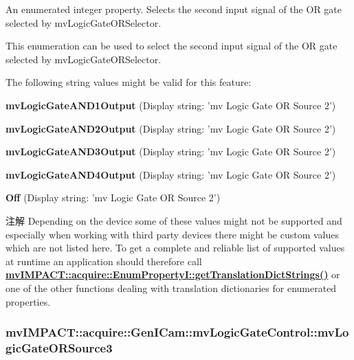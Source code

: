 An enumerated integer property. Selects the second input signal of the O\+R gate selected by mv\+Logic\+Gate\+O\+R\+Selector. 

This enumeration can be used to select the second input signal of the O\+R gate selected by mv\+Logic\+Gate\+O\+R\+Selector.

The following string values might be valid for this feature\+:
\begin{DoxyItemize}
\item {\bfseries mv\+Logic\+Gate\+A\+N\+D1\+Output} (Display string\+: 'mv Logic Gate O\+R Source 2')
\item {\bfseries mv\+Logic\+Gate\+A\+N\+D2\+Output} (Display string\+: 'mv Logic Gate O\+R Source 2')
\item {\bfseries mv\+Logic\+Gate\+A\+N\+D3\+Output} (Display string\+: 'mv Logic Gate O\+R Source 2')
\item {\bfseries mv\+Logic\+Gate\+A\+N\+D4\+Output} (Display string\+: 'mv Logic Gate O\+R Source 2')
\item {\bfseries Off} (Display string\+: 'mv Logic Gate O\+R Source 2')
\end{DoxyItemize}

\begin{DoxyNote}{注解}
Depending on the device some of these values might not be supported and especially when working with third party devices there might be custom values which are not listed here. To get a complete and reliable list of supported values at runtime an application should therefore call {\bfseries \hyperlink{classmv_i_m_p_a_c_t_1_1acquire_1_1_enum_property_i_a0ba6ccbf5ee69784d5d0b537924d26b6}{mv\+I\+M\+P\+A\+C\+T\+::acquire\+::\+Enum\+Property\+I\+::get\+Translation\+Dict\+Strings()}} or one of the other functions dealing with translation dictionaries for enumerated properties. 
\end{DoxyNote}
\hypertarget{classmv_i_m_p_a_c_t_1_1acquire_1_1_gen_i_cam_1_1mv_logic_gate_control_a9a15bc3b47b09064645418e4ba079948}{
\subsubsection[{mv\+Logic\+Gate\+O\+R\+Source3}]{ mv\+I\+M\+P\+A\+C\+T\+::acquire\+::\+Gen\+I\+Cam\+::mv\+Logic\+Gate\+Control\+::mv\+Logic\+Gate\+O\+R\+Source3}}\label{classmv_i_m_p_a_c_t_1_1acquire_1_1_gen_i_cam_1_1mv_logic_gate_control_a9a15bc3b47b09064645418e4ba079948}


